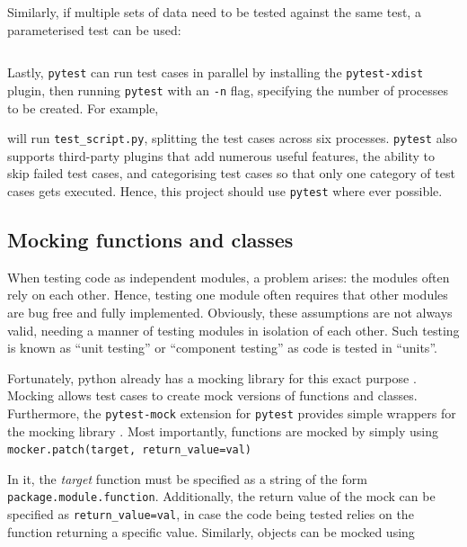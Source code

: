 \documentclass[11pt]{article}
\begin{document}
\inputminted{python}{python_examples/pytest_fixture.py}

\noindent
Similarly, if multiple sets of data need to be tested against the same test, a parameterised test can be used:

\inputminted{python}{python_examples/pytest_parameterize.py}

\noindent
Lastly, \texttt{pytest} can run test cases in parallel by installing the \texttt{pytest-xdist} plugin, then running \texttt{pytest} with an \texttt{-n} flag, specifying the number of processes to be created. For example,


\noindent
will run \texttt{test\_script.py}, splitting the test cases across six processes. \texttt{pytest} also supports third-party plugins that add numerous useful features, the ability to skip failed test cases, and categorising test cases so that only one category of test cases gets executed. Hence, this project should use \texttt{pytest} where ever possible.

\subsection{Mocking functions and classes}

When testing code as independent modules, a problem arises: the modules often rely on each other. Hence, testing one module often requires that other modules are bug free and fully implemented. Obviously, these assumptions are not always valid, needing a manner of testing modules in isolation of each other. Such testing is known as ``unit testing'' or ``component testing'' as code is tested in ``units''.

Fortunately, \Gls{python} already has a mocking \gls{library} for this exact purpose \cite{python-mock}. Mocking allows test cases to create mock versions of functions and classes. Furthermore, the \texttt{pytest-mock} extension for \texttt{pytest} provides simple wrappers for the mocking \gls{library} \cite{pytest-mock}. Most importantly, functions are mocked by simply using \texttt{mocker.patch(target, return_value=val)}

\vspace{\baselineskip}

\noindent
In it, the \textit{target} function must be specified as a string of the form \texttt{package.module.function}. Additionally, the return value of the mock can be specified as \texttt{return_value=val}, in case the code being tested relies on the function returning a specific value. Similarly, \glspl{object} can be mocked using
\end{document}
